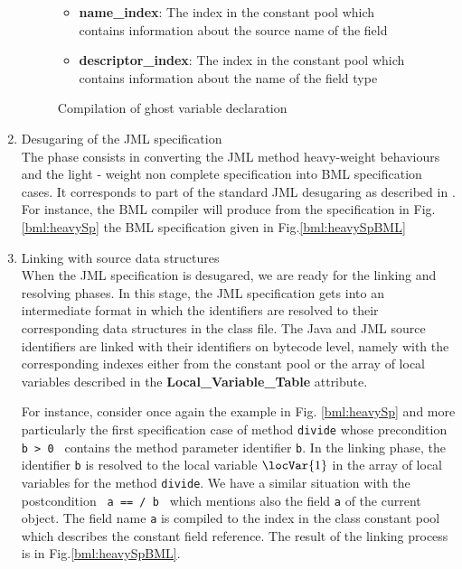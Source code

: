 \begin{enumerate}
\begin{figure}[t]
\begin{itemize}
\item \textbf{name\_index}:  The index in the constant pool which contains information about the source name of the field

\item \textbf{descriptor\_index}: The index in the constant pool which contains information about the name of the field type  
\end{itemize}


\caption{\sc Compilation of ghost variable declaration}
\label{bml:compiler:ghost}
\end{figure}

\item Desugaring of the JML specification \\
      The phase consists in converting the JML method heavy-weight behaviours and the light - weight non complete
      specification into BML specification cases.
      It corresponds to part of the standard JML desugaring as described  in \cite{RT03djml}.
      For instance, the BML compiler will produce from the specification in Fig.\ref{bml:heavySp} the BML specification 
      given in Fig.\ref{bml:heavySpBML} 
      



\item Linking with source data structures \\
      When the JML specification is desugared, we are ready for the linking and resolving phases.
      In this stage, the JML specification gets into an intermediate format in which 
      the identifiers are resolved to their corresponding data structures in the class file.
      The Java and JML source identifiers are linked with their identifiers on bytecode level, 
      namely with the corresponding indexes either from the constant pool or the array of 
      local variables described in the \textbf{Local\_Variable\_Table} attribute. 

      For instance, consider once again the example in Fig. \ref{bml:heavySp} and more particularly  the first specification
      case of method \texttt{divide}  whose precondition \texttt{ b > 0 }  contains the method parameter identifier \texttt{b}.
      In the linking phase, the identifier \texttt{b} is resolved to the local variable $\locVar{1}$  in the array of
      local variables for the method \texttt{divide}.
      We have a similar situation with the postcondition \texttt{ a ==  / b }  which mentions also the field \texttt{a} of the current object.
      The field name \texttt{a} is compiled to the index in the class constant pool  which describes the constant field reference.
      The result of the linking process is in Fig.\ref{bml:heavySpBML}.


\end{enumerate}
